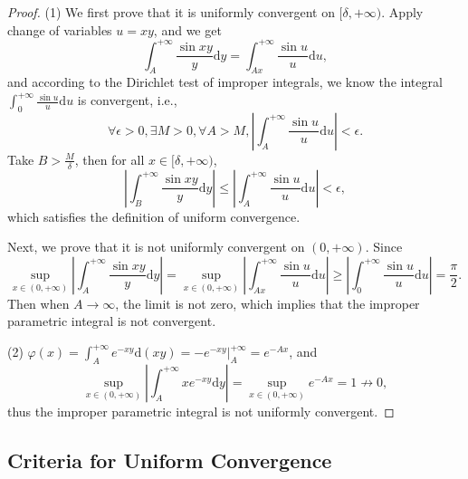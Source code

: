 \begin{proof}
  (1) We first prove that it is uniformly convergent on $[\delta, +\infty)$.
  Apply change of variables $u = xy$, and we get
  \begin{equation}
    \int_A^{+\infty} \frac{\sin xy}{y} \mathrm{d} y = \int_{Ax}^{+\infty} \frac{\sin u}{u} \mathrm{d} u,
  \end{equation}
  and according to the Dirichlet test of improper integrals, we know the integral
  $\int_0^{+\infty} \frac{\sin u}{u} \mathrm{d} u$ is convergent, i.e.,
  \begin{equation}
    \forall \epsilon > 0, \exists M > 0, \forall A > M,
    \left| \int_A^{+\infty} \frac{\sin u}{u} \mathrm{d} u \right| < \epsilon.
  \end{equation}
  Take $B > \frac{M}{\delta}$, then for all $x \in [\delta, +\infty)$,
  \begin{equation}
    \left| \int_B^{+\infty} \frac{\sin xy}{y}\mathrm{d} y \right|
    \leq \left| \int_A^{+\infty} \frac{\sin u}{u} \mathrm{d} u \right| < \epsilon,
  \end{equation}
  which satisfies the definition of uniform convergence.

  Next, we prove that it is not uniformly convergent on $(0, +\infty)$.
  Since
  \begin{equation}
    \sup \limits_{x \in (0, +\infty)} \left| \int_A^{+\infty} \frac{\sin xy}{y}\mathrm{d} y \right|
    = \sup \limits_{x \in (0, +\infty)} \left| \int_{Ax}^{+\infty} \frac{\sin u}{u} \mathrm{d} u \right|
    \geq \left| \int_0^{+\infty} \frac{\sin u}{u}\mathrm{d} u \right| = \frac{\pi}{2}.
  \end{equation}
  Then when $A \rightarrow \infty$, the limit is not zero,
  which implies that the improper parametric integral is not convergent.

  (2) $\varphi(x) = \int_A^{+\infty} e^{-xy}\mathrm{d}(xy) =
  -e^{-xy}\big|^{+\infty}_A = e^{-Ax}$,
  and
  \begin{equation}
    \sup \limits_{x \in (0, +\infty)} \left| \int_A^{+\infty} xe^{-xy}\mathrm{d} y \right|
    = \sup \limits_{x \in (0, +\infty)} e^{-Ax} = 1 \not \rightarrow 0,
  \end{equation}
  thus the improper parametric integral is not uniformly convergent.
\end{proof}

\subsection{Criteria for Uniform Convergence}

